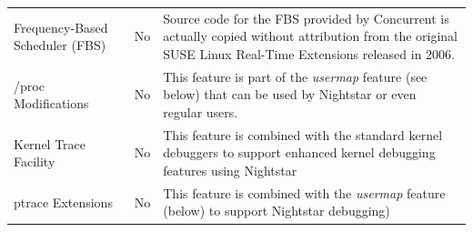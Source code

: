 \documentclass[12pt]{article}
\begin{document}
\begin{table}[H]
{\begin{tabular}{p{2.8in}p{1.2in}p{3.6in}}
Frequency-Based Scheduler (FBS) & No & Source code for the FBS provided by Concurrent is actually copied without attribution from the original SUSE Linux Real-Time Extensions released in 2006. \\
/proc Modifications & No & This feature is part of the \emph{usermap} feature (see below) that can be used by Nightstar or even regular users.\\
Kernel Trace Facility & No & This feature is combined with the standard kernel debuggers to support enhanced kernel debugging features using Nightstar \\
ptrace Extensions & No & This feature is combined with the \emph{usermap} feature (below) to support Nightstar debugging) \\
    \hline
    \end{tabular}%
    }
    \label{tab:redhawk_features_1}
\end{table}
\end{document}
